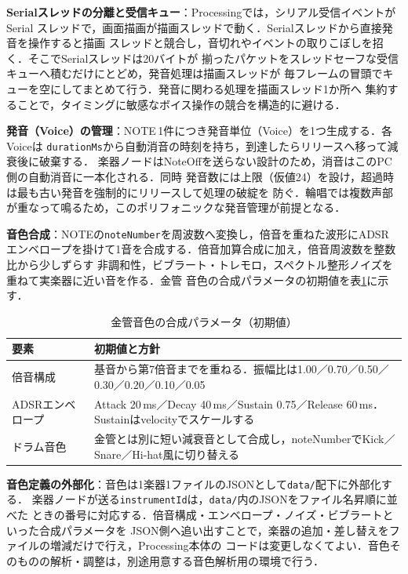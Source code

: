 \documentclass[lualatex,book,paper=a4paper,jafontsize=11.5pt,jafontscale=1.05]{jlreq}
\begin{document}
\textbf{Serialスレッドの分離と受信キュー}：Processingでは，シリアル受信イベントがSerial
スレッドで，画面描画が描画スレッドで動く．Serialスレッドから直接発音を操作すると描画
スレッドと競合し，音切れやイベントの取りこぼしを招く．そこでSerialスレッドは20バイトが
揃ったパケットをスレッドセーフな受信キューへ積むだけにとどめ，発音処理は描画スレッドが
毎フレームの冒頭でキューを空にしてまとめて行う．発音に関わる処理を描画スレッド1か所へ
集約することで，タイミングに敏感なボイス操作の競合を構造的に避ける．

\textbf{発音（Voice）の管理}：NOTE\,1件につき発音単位（Voice）を1つ生成する．各Voiceは
\texttt{durationMs}から自動消音の時刻を持ち，到達したらリリースへ移って減衰後に破棄する．
楽器ノードはNoteOffを送らない設計のため，消音はこのPC側の自動消音に一本化される．同時
発音数には上限（仮値24）を設け，超過時は最も古い発音を強制的にリリースして処理の破綻を
防ぐ．輪唱では複数声部が重なって鳴るため，このポリフォニックな発音管理が前提となる．

\textbf{音色合成}：NOTEの\texttt{noteNumber}を周波数へ変換し，倍音を重ねた波形にADSR
エンベロープを掛けて1音を合成する．倍音加算合成に加え，倍音周波数を整数比から少しずらす
非調和性，ビブラート・トレモロ，スペクトル整形ノイズを重ねて実楽器に近い音を作る．金管
音色の合成パラメータの初期値を表\ref{tab:timbre}に示す．
\begin{table}[H]\centering
  \caption{金管音色の合成パラメータ（初期値）}\label{tab:timbre}
  \small
  \begin{tabularx}{\linewidth}{>{\raggedright\arraybackslash}p{3.0cm} X}
    \toprule
    要素 & 初期値と方針 \\
    \midrule
    倍音構成 & 基音から第7倍音までを重ねる．振幅比は1.00／0.70／0.50／0.30／0.20／0.10／0.05 \\
    ADSRエンベロープ & Attack 20\,ms／Decay 40\,ms／Sustain 0.75／Release 60\,ms．Sustainはvelocityでスケールする \\
    ドラム音色 & 金管とは別に短い減衰音として合成し，noteNumberでKick／Snare／Hi-hat風に切り替える \\
    \bottomrule
  \end{tabularx}
\end{table}

\textbf{音色定義の外部化}：音色は1楽器1ファイルのJSONとして\texttt{data/}配下に外部化する．
楽器ノードが送る\texttt{instrumentId}は，\texttt{data/}内のJSONをファイル名昇順に並べた
ときの番号に対応する．倍音構成・エンベロープ・ノイズ・ビブラートといった合成パラメータを
JSON側へ追い出すことで，楽器の追加・差し替えをファイルの増減だけで行え，Processing本体の
コードは変更しなくてよい．音色そのものの解析・調整は，別途用意する音色解析用の環境で行う．
\end{document}
